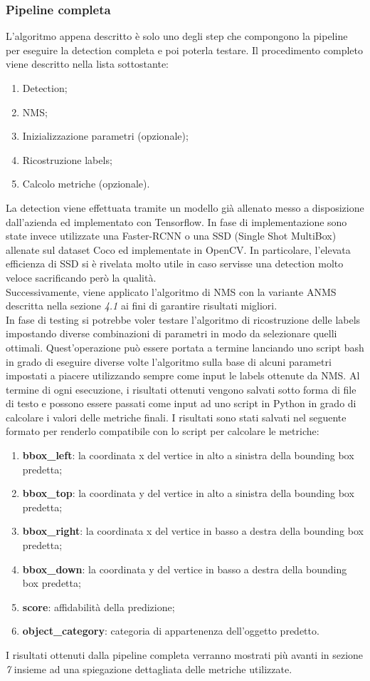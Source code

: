 \subsubsection{Pipeline completa}
L'algoritmo appena descritto è solo uno degli step che compongono la pipeline per eseguire la detection completa e poi poterla testare. Il procedimento completo viene descritto nella lista sottostante:
\begin{enumerate}
\item Detection;
\item NMS;
\item Inizializzazione parametri (opzionale);
\item Ricostruzione labels;
\item Calcolo metriche (opzionale).
\end{enumerate}
La detection viene effettuata tramite un modello già allenato messo a disposizione dall'azienda ed implementato con Tensorflow. In fase di implementazione sono state invece utilizzate una Faster-RCNN o una SSD (Single Shot MultiBox) allenate sul dataset Coco ed implementate in OpenCV. In particolare, l'elevata efficienza di SSD si è rivelata molto utile in caso servisse una detection molto veloce sacrificando però la qualità.\\
Successivamente, viene applicato l'algoritmo di NMS con la variante ANMS descritta nella sezione \textit{4.1} ai fini di garantire risultati migliori.\\
In fase di testing si potrebbe voler testare l'algoritmo di ricostruzione delle labels impostando diverse combinazioni di parametri in modo da selezionare quelli ottimali. Quest'operazione può essere portata a termine lanciando uno script bash in grado di eseguire diverse volte l'algoritmo sulla base di alcuni parametri impostati a piacere utilizzando sempre come input le labels ottenute da NMS. Al termine di ogni esecuzione, i risultati ottenuti vengono salvati sotto forma di file di testo e possono essere passati come input ad uno script in Python in grado di calcolare i valori delle metriche finali. I risultati sono stati salvati nel seguente formato per renderlo compatibile con lo script per calcolare le metriche:
\begin{enumerate}
\item \textbf{bbox\_left}: la coordinata x del vertice in alto a sinistra della bounding box predetta;
\item \textbf{bbox\_top}: la coordinata y del vertice in alto a sinistra della bounding box predetta;
\item \textbf{bbox\_right}: la coordinata x del vertice in basso a destra della bounding box predetta;
\item \textbf{bbox\_down}: la coordinata y del vertice in basso a destra della bounding box predetta;
\item \textbf{score}: affidabilità della predizione;
\item \textbf{object\_category}: categoria di appartenenza dell'oggetto predetto.
\end{enumerate}
I risultati ottenuti dalla pipeline completa verranno mostrati più avanti in sezione \textit{7} insieme ad una spiegazione dettagliata delle metriche utilizzate.

